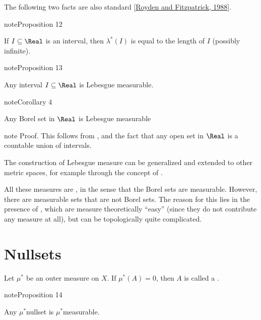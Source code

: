 \documentclass[letterpaper,10pt,english]{jupyterBook}
\begin{document}
\sphinxAtStartPar
The following two facts are also standard {[}\hyperlink{cite.bibliography:id14}{Royden and Fitzpatrick, 1988}{]}.
\label{measure:prop-outer-meas-interval}
\begin{sphinxadmonition}{note}{Proposition 12}



\sphinxAtStartPar
If \(I \subseteq \Real\) is an interval, then \(\lambda^*(I)\) is equal to the length of \(I\) (possibly infinite).
\end{sphinxadmonition}
\label{measure:prop-interval-measurable}
\begin{sphinxadmonition}{note}{Proposition 13}



\sphinxAtStartPar
Any interval \(I \subseteq \Real\) is Lebesgue measurable.
\end{sphinxadmonition}
\label{measure:cor-Borel-measurable}
\begin{sphinxadmonition}{note}{Corollary 4}



\sphinxAtStartPar
Any Borel set in \(\Real\) is Lebesgue measurable
\end{sphinxadmonition}

\begin{sphinxadmonition}{note}
\sphinxAtStartPar
Proof. This follows from {\hyperref[\detokenize{measure:prop-measurable-sets}]{}}, {\hyperref[\detokenize{measure:prop-interval-measurable}]{}} and the fact that any open set in \(\Real\) is a countable union of intervals.
\end{sphinxadmonition}

\sphinxAtStartPar
The construction of Lebesgue measure can be generalized and extended to other metric spaces, for example through the concept of .

\sphinxAtStartPar
All these measures are , in the sense that the Borel sets are measurable. However, there are measurable sets that are not Borel sets. The reason for this lies in the presence of , which are measure theoretically “easy” (since they do not contribute any measure at all), but can be topologically quite complicated.


\section{Nullsets}
\label{\detokenize{measure:nullsets}}
\sphinxAtStartPar
Let \(\mu^*\) be an outer measure on \(X\). If \(\mu^*(A) = 0\), then \(A\) is called a .
\label{measure:prop-nullsets-measurable}
\begin{sphinxadmonition}{note}{Proposition 14}



\sphinxAtStartPar
Any \(\mu^*\)\sphinxhyphen{}nullset is \(\mu^*\)\sphinxhyphen{}measurable.
\end{sphinxadmonition}
\end{document}
